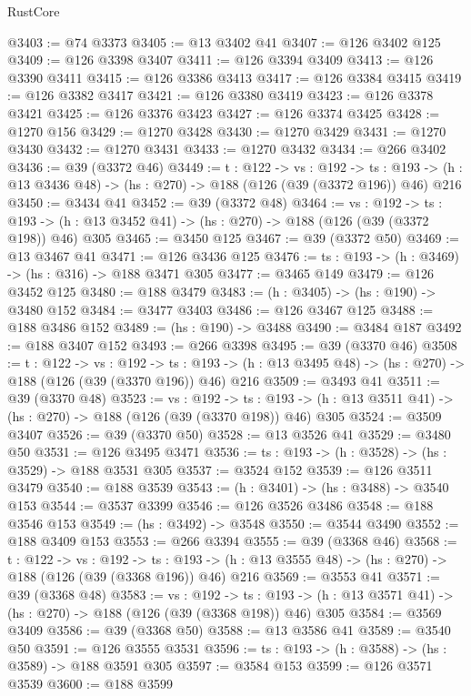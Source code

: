 \begin{lexlean}{RustCore}
\begin{coremodule}
@3403 := @74 @3373
@3405 := @13 @3402 @41
@3407 := @126 @3402 @125
@3409 := @126 @3398 @3407
@3411 := @126 @3394 @3409
@3413 := @126 @3390 @3411
@3415 := @126 @3386 @3413
@3417 := @126 @3384 @3415
@3419 := @126 @3382 @3417
@3421 := @126 @3380 @3419
@3423 := @126 @3378 @3421
@3425 := @126 @3376 @3423
@3427 := @126 @3374 @3425
@3428 := @1270 @156
@3429 := @1270 @3428
@3430 := @1270 @3429
@3431 := @1270 @3430
@3432 := @1270 @3431
@3433 := @1270 @3432
@3434 := @266 @3402
@3436 := @39 (@3372 @46)
@3449 := {t : @122} ->
  {vs : @192} ->
  {ts : @193} -> (h : @13 @3436 @48) -> (hs : @270) -> @188 (@126 (@39 (@3372 @196)) @46) @216
@3450 := @3434 @41
@3452 := @39 (@3372 @48)
@3464 := {vs : @192} ->
  {ts : @193} -> (h : @13 @3452 @41) -> (hs : @270) -> @188 (@126 (@39 (@3372 @198)) @46) @305
@3465 := @3450 @125
@3467 := @39 (@3372 @50)
@3469 := @13 @3467 @41
@3471 := @126 @3436 @125
@3476 := {ts : @193} -> (h : @3469) -> (hs : @316) -> @188 @3471 @305
@3477 := @3465 @149
@3479 := @126 @3452 @125
@3480 := @188 @3479
@3483 := (h : @3405) -> (hs : @190) -> @3480 @152
@3484 := @3477 @3403
@3486 := @126 @3467 @125
@3488 := @188 @3486 @152
@3489 := (hs : @190) -> @3488
@3490 := @3484 @187
@3492 := @188 @3407 @152
@3493 := @266 @3398
@3495 := @39 (@3370 @46)
@3508 := {t : @122} ->
  {vs : @192} ->
  {ts : @193} -> (h : @13 @3495 @48) -> (hs : @270) -> @188 (@126 (@39 (@3370 @196)) @46) @216
@3509 := @3493 @41
@3511 := @39 (@3370 @48)
@3523 := {vs : @192} ->
  {ts : @193} -> (h : @13 @3511 @41) -> (hs : @270) -> @188 (@126 (@39 (@3370 @198)) @46) @305
@3524 := @3509 @3407
@3526 := @39 (@3370 @50)
@3528 := @13 @3526 @41
@3529 := @3480 @50
@3531 := @126 @3495 @3471
@3536 := {ts : @193} -> (h : @3528) -> (hs : @3529) -> @188 @3531 @305
@3537 := @3524 @152
@3539 := @126 @3511 @3479
@3540 := @188 @3539
@3543 := (h : @3401) -> (hs : @3488) -> @3540 @153
@3544 := @3537 @3399
@3546 := @126 @3526 @3486
@3548 := @188 @3546 @153
@3549 := (hs : @3492) -> @3548
@3550 := @3544 @3490
@3552 := @188 @3409 @153
@3553 := @266 @3394
@3555 := @39 (@3368 @46)
@3568 := {t : @122} ->
  {vs : @192} ->
  {ts : @193} -> (h : @13 @3555 @48) -> (hs : @270) -> @188 (@126 (@39 (@3368 @196)) @46) @216
@3569 := @3553 @41
@3571 := @39 (@3368 @48)
@3583 := {vs : @192} ->
  {ts : @193} -> (h : @13 @3571 @41) -> (hs : @270) -> @188 (@126 (@39 (@3368 @198)) @46) @305
@3584 := @3569 @3409
@3586 := @39 (@3368 @50)
@3588 := @13 @3586 @41
@3589 := @3540 @50
@3591 := @126 @3555 @3531
@3596 := {ts : @193} -> (h : @3588) -> (hs : @3589) -> @188 @3591 @305
@3597 := @3584 @153
@3599 := @126 @3571 @3539
@3600 := @188 @3599

\end{coremodule}
\end{lexlean}
